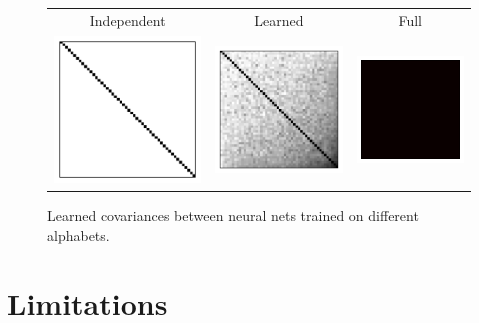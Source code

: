 \documentclass{article}
\begin{document}
\begin{figure}[h!]
\begin{center}
\begin{tabular}{ccc}
Independent & Learned & Full \\
\hspace{-1em}\includegraphics[width=0.31 \columnwidth]{../experiments/Feb_1_learning_alphabet_corr/5/covar_eye.pdf} &
\hspace{-1em}\includegraphics[width=0.31 \columnwidth]{../experiments/Feb_1_learning_alphabet_corr/5/covar_learned_toplayer.pdf} &
\hspace{-1em}\includegraphics[width=0.31 \columnwidth]{../experiments/Feb_1_learning_alphabet_corr/5/covar_full.pdf}
\end{tabular}
\caption{Learned covariances between neural nets trained on different alphabets.}
\label{fig:omniglot}
\end{center}
\end{figure} 



\section{Limitations}
\end{document}
